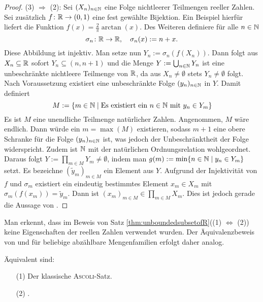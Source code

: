 \begin{proof}
  (3) $\Rightarrow$ (2):
  Sei $(X_n)_{n \in \mathbb{N}}$ eine Folge nichtleerer Teilmengen reeller Zahlen.
  Sei zusätzlich $f \colon \mathbb{R} \to (0,1)$ eine fest gewählte Bijektion.
  Ein Beispiel hierfür liefert die Funktion $f(x) = \frac{2}{\pi}\arctan(x)$.
  Des Weiteren definiere für alle $n \in \mathbb{N}$
  \begin{displaymath}
    \sigma_n \colon \mathbb{R} \to \mathbb{R}, \quad \sigma_n(x) := n + x.
  \end{displaymath}
  Diese Abbildung ist injektiv.
  Man setze nun $Y_n := \sigma_n(f(X_n))$. 
  Dann folgt aus $X_n \subseteq \mathbb{R}$ sofort $Y_n \subseteq (n,n+1)$ und die Menge $Y:= \bigcup_{n \in \mathbb{N}} Y_n$ ist eine unbeschränkte nichtleere Teilmenge von $\mathbb{R}$, da aus $X_n \neq \emptyset$ stets $Y_n \neq \emptyset$ folgt.
  Nach Voraussetzung existiert eine unbeschränkte Folge $(y_n)_{n \in \mathbb{N}}$ in $Y$.
  Damit definiert
  \begin{displaymath}
    M := \{m \in \mathbb{N} \mid \text{Es existiert ein } n \in \mathbb{N} \text{ mit } y_n \in Y_m\}
  \end{displaymath}
  Es ist $M$ eine unendliche Teilmenge natürlicher Zahlen.
  Angenommen, $M$ wäre endlich.
  Dann würde ein $m = \max(M)$ existieren, sodass $m + 1$ eine obere Schranke für die Folge $(y_n)_{n \in \mathbb{N}}$ ist, was jedoch der Unbeschränktheit der Folge widerspricht.
  Zudem ist $\mathbb{N}$ mit der natürlichen Ordnungsrelation wohlgeordnet.
  Daraus folgt $Y := \prod_{m \in M} Y_m \neq \emptyset$, indem man $g(m) := \min\{n \in \mathbb{N} \mid y_n \in Y_m\}$ setzt.
  Es bezeichne $(\tilde{y}_m)_{m \in M}$ ein Element aus $Y$.
  Aufgrund der Injektivität von $f$ und $\sigma_m$ existiert ein eindeutig bestimmtes Element $x_m \in X_m$ mit $\sigma_m(f(x_m)) = \tilde{y}_m$.
  Dann ist $(x_m)_{m \in M} \in \prod_{m \in M} X_m$.
  Dies ist jedoch gerade die Aussage von \PCCR.
\end{proof}

\begin{bem}
  Man erkennt, dass im Beweis von Satz \ref{thm:unboundedsubsetofR}((1) $\Leftrightarrow$ (2)) keine Eigenschaften der reellen Zahlen verwendet wurden. Der Äquivalenzbeweis von \CC und \PCC für beliebige abzählbare Mengenfamilien erfolgt daher analog.
\end{bem}

\begin{thm}
  \label{thm:classicalascoli}
  Äquivalent sind:
  \begin{enumerate}
    \item[(1)] Der klassische \textsc{Ascoli}-Satz.
    \item[(2)] \CCR.
  \end{enumerate}
\end{thm}

